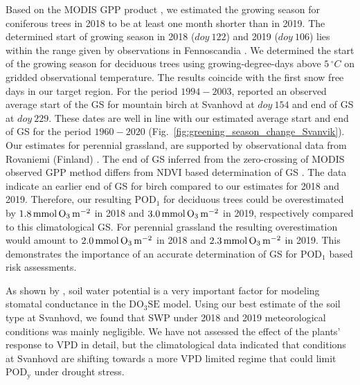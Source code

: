 \documentclass[bg, manuscript]{copernicus}
\begin{document}
Based on the MODIS GPP product \citep{MODIS_PSN}, we estimated the growing season for coniferous trees in 2018 to be at least one month shorter than in 2019. The determined start of growing season in 2018 ($\unit{doy}~122$) and 2019 ($\unit{doy}~106$) lies within the range given by observations in Fennoscandia \citep{TB:Kolari2007,IVL:Karlsson2018}. We determined the start of the growing season for deciduous trees using growing-degree-days above $5\,\unit{^\circ C}$ on gridded observational temperature. The results coincide with the first snow free days in our target region.
For the period $1994-2003$, \citet{IJB:Shutova2006} reported an observed average start of the GS for mountain birch at Svanhovd at $\unit{doy}~154$ and end of GS at $\unit{doy}~229$. These dates are well in line with our estimated average start and end of GS for the period $1960-2020$ (Fig.~\ref{fig:greening_season_change_Svanvik}).
Our estimates for perennial grassland, are supported by observational data from Rovaniemi (Finland) \citep{FCR:Korhonen2018}. The end of GS inferred from the zero-crossing of MODIS observed GPP method differs from NDVI based determination of GS \citep{IGARSS:Hogda2001,IJB:Karlsen2007, RS:Hogda2013}.
The \citet{IJB:Shutova2006} data indicate an earlier end of GS for birch compared to our estimates for 2018 and 2019. Therefore, our resulting $\mathrm{POD_1}$ for deciduous trees could be overestimated by $1.8\,\unit{mmol\,\chem{O_3}\,m^{-2}}$ in 2018 and $3.0\,\unit{mmol\,\chem{O_3}\,m^{-2}}$ in 2019, respectively compared to this climatological GS. For perennial grassland the resulting overestimation would amount to $2.0\,\unit{mmol\,\chem{O_3}\,m^{-2}}$ in 2018 and $2.3\,\unit{mmol\,\chem{O_3}\,m^{-2}}$ in 2019. This demonstrates the importance of an accurate determination of GS for $\mathrm{POD_1}$ based risk assessments.

As shown by \citet{ACP:Bueker2012}, soil water potential is a very important factor for modeling stomatal conductance in the $\mathrm{DO_3SE}$ model. Using our best estimate of the soil type at Svanhovd, we found that SWP under 2018 and 2019 meteorological conditions was mainly negligible. We have not assessed the effect of the plants' response to VPD in detail, but the climatological data indicated that conditions at Svanhovd are shifting towards a more VPD limited regime that could limit $\mathrm{POD_y}$ under drought stress. 
\end{document}
